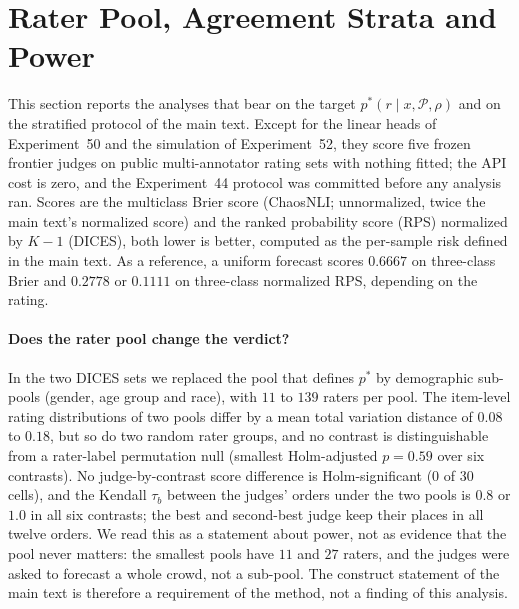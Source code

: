 
\section{Rater Pool, Agreement Strata and Power}
\label{sec:supp-pool-strata}

This section reports the analyses that bear on the target $p^*(r\mid x,\mathcal{P},\rho)$ and on the stratified protocol of the main text.
Except for the linear heads of Experiment~50 and the simulation of Experiment~52, they score five frozen frontier judges on public multi-annotator rating sets with nothing fitted; the API cost is zero, and the Experiment~44 protocol was committed before any analysis ran.
Scores are the multiclass Brier score (ChaosNLI; unnormalized, twice the main text's normalized score) and the ranked probability score (RPS) normalized by $K-1$ (DICES), both lower is better, computed as the per-sample risk defined in the main text.
As a reference, a uniform forecast scores $0.6667$ on three-class Brier and $0.2778$ or $0.1111$ on three-class normalized RPS, depending on the rating.

\paragraph{Does the rater pool change the verdict?}
In the two DICES sets we replaced the pool that defines $p^*$ by demographic sub-pools (gender, age group and race), with $11$ to $139$ raters per pool.
The item-level rating distributions of two pools differ by a mean total variation distance of $0.08$ to $0.18$, but so do two random rater groups, and no contrast is distinguishable from a rater-label permutation null (smallest Holm-adjusted $p=0.59$ over six contrasts).
No judge-by-contrast score difference is Holm-significant ($0$ of $30$ cells), and the Kendall $\tau_b$ between the judges' orders under the two pools is $0.8$ or $1.0$ in all six contrasts; the best and second-best judge keep their places in all twelve orders.
We read this as a statement about power, not as evidence that the pool never matters: the smallest pools have $11$ and $27$ raters, and the judges were asked to forecast a whole crowd, not a sub-pool.
The construct statement of the main text is therefore a requirement of the method, not a finding of this analysis.

